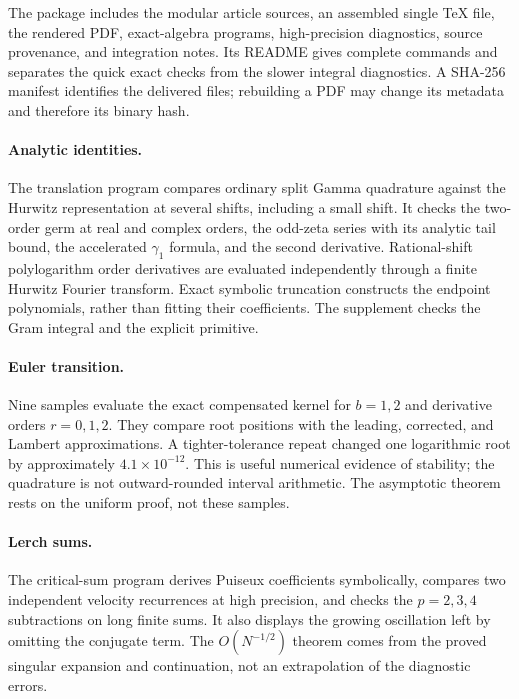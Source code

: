 The package includes the modular article sources, an assembled single
TeX file, the rendered PDF, exact-algebra programs, high-precision
diagnostics, source provenance, and integration notes. Its README
gives complete commands and separates the quick exact checks from
the slower integral diagnostics. A SHA-256 manifest identifies the
delivered files; rebuilding a PDF may change its metadata and therefore
its binary hash.

\paragraph{Analytic identities.}
The translation program compares ordinary split Gamma quadrature
against the Hurwitz representation at several shifts, including a
small shift. It checks the two-order germ at real and complex orders,
the odd-zeta series with its analytic tail bound, the accelerated
$\gamma_1$ formula, and the second derivative. Rational-shift
polylogarithm order derivatives are evaluated independently through a
finite Hurwitz Fourier transform. Exact symbolic truncation constructs
the endpoint polynomials, rather than fitting their coefficients.
The supplement checks the Gram integral and the explicit primitive.

\paragraph{Euler transition.}
Nine samples evaluate the exact compensated kernel for $b=1,2$ and
derivative orders $r=0,1,2$. They compare root positions with the
leading, corrected, and Lambert approximations. A tighter-tolerance
repeat changed one logarithmic root by approximately
$4.1\times10^{-12}$. This is useful numerical evidence of stability;
the quadrature is not outward-rounded interval arithmetic. The
asymptotic theorem rests on the uniform proof, not these samples.

\paragraph{Lerch sums.}
The critical-sum program derives Puiseux coefficients symbolically,
compares two independent velocity recurrences at high precision, and
checks the $p=2,3,4$ subtractions on long finite sums. It also displays
the growing oscillation left by omitting the conjugate term.
The $O(N^{-1/2})$ theorem comes from the proved singular expansion
and continuation, not an extrapolation of the diagnostic errors.


